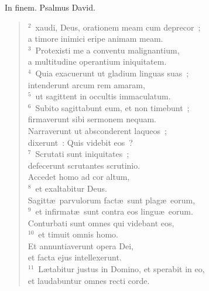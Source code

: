 \bchapter[Psalm]
In finem. Psalmus David.
\begin{verse}${}^{2}$~xaudi, Deus, orationem meam cum deprecor~;\\ a timore inimici eripe animam meam.\\
${}^{3}$~Protexisti me a conventu malignantium,\\ a multitudine operantium iniquitatem.\\
${}^{4}$~Quia exacuerunt ut gladium linguas suas~;\\ intenderunt arcum rem amaram,\\
${}^{5}$~ut sagittent in occultis immaculatum.\\
${}^{6}$~Subito sagittabunt eum, et non timebunt~;\\ firmaverunt sibi sermonem nequam.\\ Narraverunt ut absconderent laqueos~;\\ dixerunt~: Quis videbit eos~?\\
${}^{7}$~Scrutati sunt iniquitates~;\\ defecerunt scrutantes scrutinio.\\ Accedet homo ad cor altum,\\
${}^{8}$~et exaltabitur Deus.\\ Sagitt\ae\ parvulorum fact\ae\ sunt plag\ae\ eorum,\\
${}^{9}$~et infirmat\ae\ sunt contra eos lingu\ae\ eorum.\\ Conturbati sunt omnes qui videbant eos,\\
${}^{10}$~et timuit omnis homo.\\ Et annuntiaverunt opera Dei,\\ et facta ejus intellexerunt.\\
${}^{11}$~L\ae tabitur justus in Domino, et sperabit in eo,\\ et laudabuntur omnes recti corde.\end{verse}




